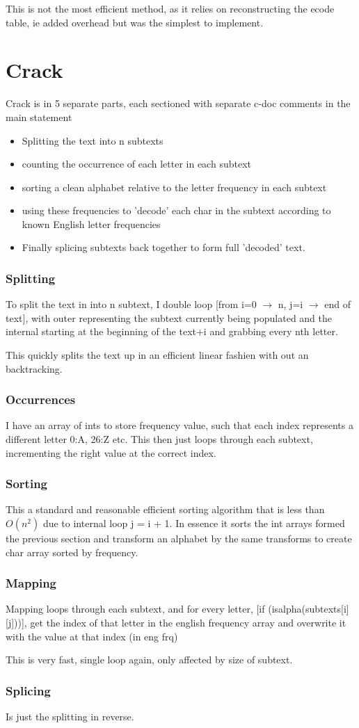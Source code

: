 \documentclass[a4paper,11pt]{article}
\begin{document}
	This is not the most efficient method, as it relies on reconstructing the ecode table, ie added overhead but was the simplest to implement. 
	\newpage
\section*{Crack}
Crack is in 5 separate parts, each sectioned with separate c-doc comments in the main statement
	\begin{itemize}
  	\item Splitting the text into n subtexts
 	\item counting the occurrence of each letter in each subtext
  	\item sorting a clean alphabet relative to the letter frequency in each subtext
  	\item using these frequencies to 'decode' each char in the subtext according to known English letter frequencies 
  	\item Finally splicing subtexts back together to form full 'decoded' text.
\end{itemize}

\subsubsection*{Splitting}
To split the text in into n subtext, I double loop [from i=0 $\rightarrow$ n, j=i $\rightarrow$ end of text], with outer representing the subtext currently being populated and the internal starting at the beginning of the text+i and grabbing every nth letter.

This quickly splits the text up in an efficient linear fashien with out an backtracking.
\subsubsection*{Occurrences}
I have an array of ints to store frequency value, such that each index represents a different letter 0:A, 26:Z etc. This then just loops through each subtext, incrementing the right value at the correct index.
\subsubsection*{Sorting}
This a standard and reasonable efficient sorting algorithm that is less than $O(n^{2})$ due to internal loop j = i + 1.
In essence it sorts the int arrays formed the previous section and transform an alphabet by the same transforms to create char array sorted by frequency.
\subsubsection*{Mapping}
Mapping loops through each subtext, and for every letter, [if (isalpha(subtexts[i][j]))], get the index of that letter in the english frequency array and overwrite it with the value at that index (in eng frq)

This is very fast, single loop again, only affected by size of subtext.
\subsubsection*{Splicing}
Is just the splitting in reverse.
\end{document}
